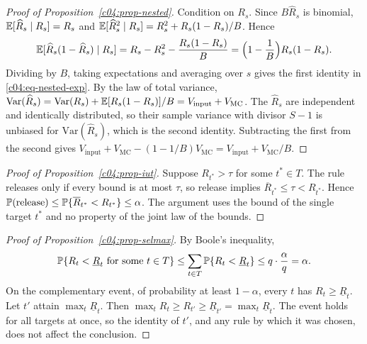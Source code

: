 \begin{proof}[Proof of Proposition~\ref{c04:prop-nested}]
Condition on $R_s$. Since $B\widehat R_s$ is binomial,
$\mathbb{E}[\widehat R_s \mid R_s] = R_s$ and $\mathbb{E}[\widehat R_s^2 \mid R_s] = R_s^2 + R_s(1-R_s)/B$.
Hence
\[
\mathbb{E}[\widehat R_s(1-\widehat R_s) \mid R_s] = R_s - R_s^2 - \frac{R_s(1-R_s)}{B}
= \Big(1 - \frac{1}{B}\Big)R_s(1-R_s).
\]
Dividing by $B$, taking expectations and averaging over $s$ gives the first identity in
\eqref{c04:eq-nested-exp}. By the law of total variance,
$\mathrm{Var}(\widehat R_s) = \mathrm{Var}(R_s) + \mathbb{E}[R_s(1-R_s)]/B =
V_{\mathrm{input}} + V_{\mathrm{MC}}$. The $\widehat R_s$ are independent and identically
distributed, so their sample variance with divisor $S-1$ is unbiased for
$\mathrm{Var}(\widehat R_s)$, which is the second identity. Subtracting the first from the
second gives $V_{\mathrm{input}} + V_{\mathrm{MC}} - (1-1/B)V_{\mathrm{MC}} =
V_{\mathrm{input}} + V_{\mathrm{MC}}/B$.
\end{proof}

\begin{proof}[Proof of Proposition~\ref{c04:prop-iut}]
Suppose $R_{t^\ast} > \tau$ for some $t^\ast \in T$. The rule releases only if every
bound is at most $\tau$, so release implies $\overline{R}_{t^\ast} \le \tau <
R_{t^\ast}$. Hence $\mathbb{P}(\text{release}) \le \mathbb{P}\{\overline{R}_{t^\ast} <
R_{t^\ast}\} \le \alpha$. The argument uses the bound of the single target $t^\ast$ and
no property of the joint law of the bounds.
\end{proof}

\begin{proof}[Proof of Proposition~\ref{c04:prop-selmax}]
By Boole's inequality,
\[
\mathbb{P}\{R_t < \underline{R}_t \ \text{for some}\ t \in T\} \le
\sum_{t \in T}\mathbb{P}\{R_t < \underline{R}_t\} \le q\cdot\frac{\alpha}{q} = \alpha .
\]
On the complementary event, of probability at least $1-\alpha$, every $t$ has
$R_t \ge \underline{R}_t$. Let $t'$ attain $\max_t \underline{R}_t$. Then
$\max_t R_t \ge R_{t'} \ge \underline{R}_{t'} = \max_t \underline{R}_t$. The event holds
for all targets at once, so the identity of $t'$, and any rule by which it was chosen,
does not affect the conclusion.
\end{proof}
